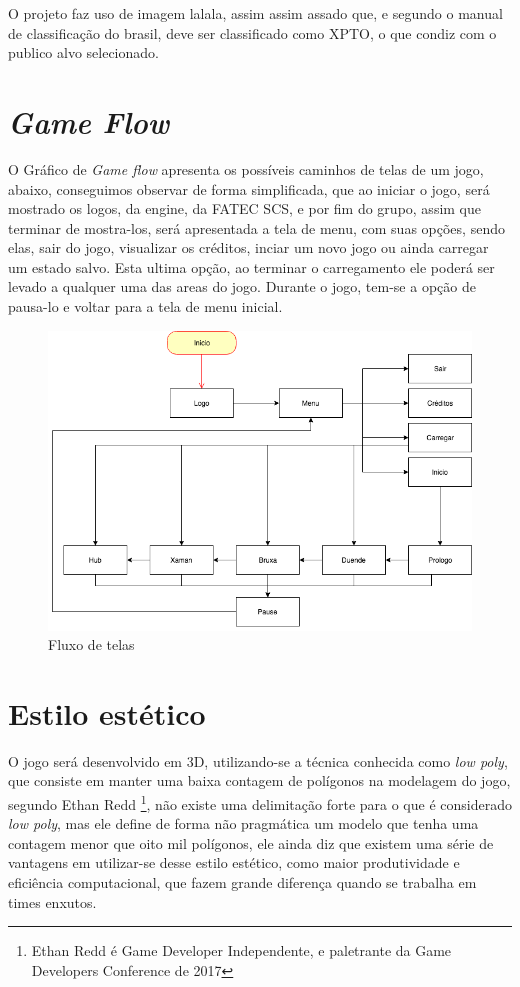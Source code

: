 O projeto faz uso de imagem lalala, assim assim assado que, e segundo o manual de classificação do brasil, deve ser classificado como XPTO, o que condiz com o publico alvo selecionado.

\section{\textit{Game Flow}}

O Gráfico de \textit{Game flow} apresenta os possíveis caminhos de telas de um jogo, abaixo, conseguimos observar de forma simplificada, que ao iniciar o jogo, será mostrado os logos, da engine, da FATEC SCS, e por fim do grupo, assim que terminar de mostra-los, será apresentada a tela de menu, com suas opções, sendo elas, sair do jogo, visualizar os créditos, inciar um novo jogo ou ainda carregar um estado salvo. Esta ultima opção, ao terminar o carregamento ele poderá ser levado a qualquer uma das areas do jogo.
Durante o jogo, tem-se a opção de pausa-lo e voltar para a tela de menu inicial.


\begin{figure}[!htb]
    \caption{\label{fig_grafico}Fluxo de telas} \begin{center}
    \includegraphics[width=\textwidth]{imagens/Flow.png} \end{center}
 \end{figure}

\section{Estilo estético}
O jogo será desenvolvido em 3D, utilizando-se a técnica conhecida como \textit{low poly}, que consiste em manter uma baixa contagem de polígonos na modelagem do jogo, segundo Ethan Redd \footnote{Ethan Redd é Game Developer Independente, e paletrante da Game Developers Conference de 2017}, não existe uma delimitação forte para o que é considerado \textit{low poly}, mas ele define de forma não pragmática um modelo que tenha uma contagem menor que oito mil polígonos, ele ainda diz que existem uma série de vantagens em utilizar-se desse estilo estético, como maior produtividade e eficiência computacional, que fazem grande diferença quando se trabalha em times enxutos.

